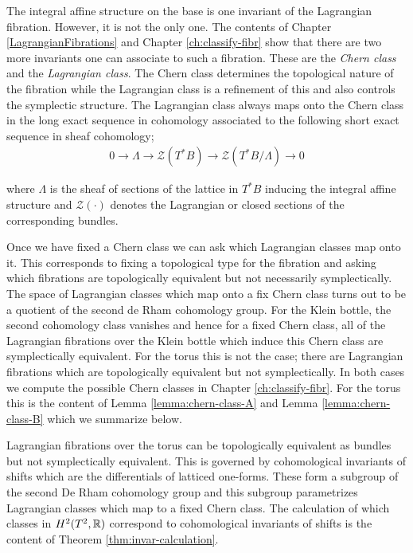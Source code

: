 \IASKlein*

The integral affine structure on the base is one invariant of the Lagrangian
fibration. However, it is not the only one. The contents of Chapter
\ref{LagrangianFibrations} and Chapter \ref{ch:classify-fibr} show that there
are two more invariants one can associate to such a fibration. These are the
\emph{Chern class} and the \emph{Lagrangian class}. The Chern class determines
the topological nature of the fibration while the Lagrangian class is a
refinement of this and also controls the symplectic structure. The Lagrangian
class always maps onto the Chern class in the long exact sequence in cohomology
associated to the following short exact sequence in sheaf cohomology;
\begin{align*}
    0 \to \Lambda \to \mathcal{Z}(T^*B) \to \mathcal{Z}(T^*B/\Lambda) \to 0
\end{align*}

where $\Lambda$ is the sheaf of sections of the lattice in $T^*B$ inducing the
integral affine structure and $\mathcal{Z}(\cdot)$ denotes the Lagrangian or
closed sections of the corresponding bundles.

Once we have fixed a Chern class we can ask which Lagrangian classes map onto
it. This corresponds to fixing a topological type for the fibration and asking
which fibrations are topologically equivalent but not necessarily
symplectically. The space of Lagrangian classes which map onto a fix Chern
class turns out to be a quotient of the second de Rham cohomology group. For
the Klein bottle, the second cohomology class vanishes and hence for a fixed
Chern class, all of the Lagrangian fibrations over the Klein bottle which
induce this Chern class are symplectically equivalent. For the torus this is
not the case; there are Lagrangian fibrations which are topologically
equivalent but not symplectically. In both cases we compute the possible Chern
classes in Chapter \ref{ch:classify-fibr}. For the torus this is the content of
Lemma \ref{lemma:chern-class-A} and Lemma \ref{lemma:chern-class-B} which we
summarize below.

\chernTorus*

Lagrangian fibrations over the torus can be topologically equivalent as bundles
but not symplectically equivalent. This is governed by cohomological invariants
of shifts which are the differentials of latticed one-forms. These form a
subgroup of the second De Rham cohomology group and this subgroup parametrizes
Lagrangian classes which map to a fixed Chern class. The calculation of which
classes in $H^2(T^2, \mathbb{R})$ correspond to cohomological invariants of shifts is
the content of Theorem \ref{thm:invar-calculation}.

